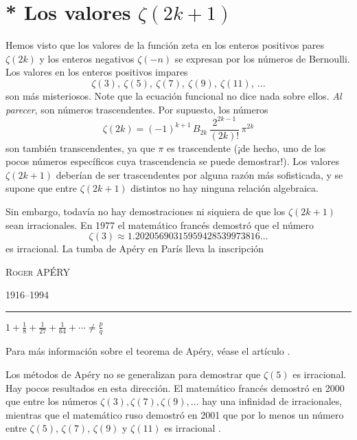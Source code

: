 \documentclass{article}
\numberwithin{equation}{section}
\theoremstyle{definition}
\begin{document}

\section{* Los valores $\zeta (2k+1)$}

Hemos visto que los valores de la función zeta en los enteros positivos pares
$\zeta (2k)$ y los enteros negativos $\zeta (-n)$ se expresan por los números
de Bernoulli. Los valores en los enteros positivos impares
$$\zeta (3), ~ \zeta (5), ~ \zeta (7), ~ \zeta (9), ~ \zeta (11), ~ \ldots$$
son más misteriosos. Note que la ecuación funcional 
no dice nada sobre ellos. \emph{Al parecer}, son números trascendentes. Por
supuesto, los números
$$\zeta (2k) = (-1)^{k+1} \, B_{2k}\,\frac{2^{2k-1}}{(2k)!}\,\pi^{2k}$$
son también transcendentes, ya que $\pi$ es trascendente (¡de hecho, uno de los
pocos números específicos cuya trascendencia se puede demostrar!). Los valores
$\zeta (2k+1)$ deberían de ser trascendentes por alguna razón más sofisticada,
y se supone que entre $\zeta (2k+1)$ distintos no hay ninguna relación
algebraica.

Sin embargo, todavía no hay demostraciones ni siquiera de que los $\zeta (2k+1)$
sean irracionales. En 1977 el matemático francés 
demostró que el número
$$\zeta (3) \approx 1.20205690315959428539973816\ldots$$
es irracional. La tumba de Apéry en París lleva la inscripción

\begin{center}
\noindent\textsc{Roger APÉRY}

\noindent\textsc{1916--1994}

\vspace{0.7em}

\noindent\rule{1cm}{0.4mm}

\vspace{1em}

\noindent$1 + \frac{1}{8} + \frac{1}{27} + \frac{1}{64} + \cdots \ne \frac{p}{q}$
\end{center}

\noindent Para más información sobre el teorema de Apéry, véase el artículo
\cite{van-der-Poorten-1978}.

Los métodos de Apéry no se generalizan para demostrar que $\zeta (5)$ es
irracional. Hay pocos resultados en esta dirección. El matemático francés
 demostró en 2000 que entre los números
$\zeta (3), \zeta (7), \zeta (9), \ldots$ hay una infinidad de irracionales,
mientras que el matemático ruso  demostró en 2001 que
por lo menos un número entre $\zeta(5)$, $\zeta(7)$, $\zeta(9)$ y $\zeta(11)$ es
irracional \cite{Zudilin-2004}.
\end{document}
